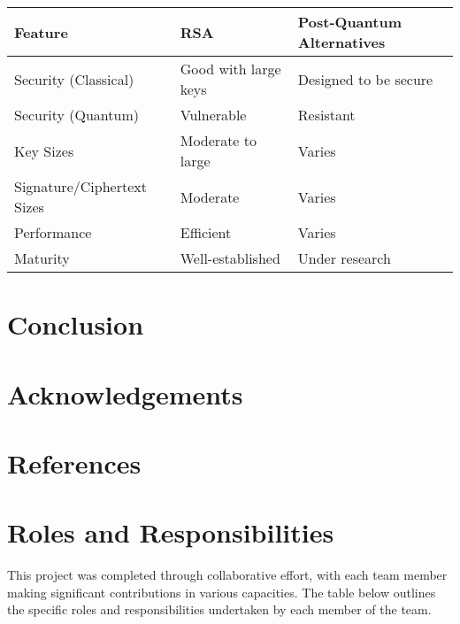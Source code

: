 \documentclass{article}
\begin{document}
\begin{center}
    \begin{tabular}{|l|l|l|}
        \hline
        \textbf{Feature}           & \textbf{RSA}         & \textbf{Post-Quantum Alternatives} \\
        \hline
        Security (Classical)       & Good with large keys & Designed to be secure              \\
        Security (Quantum)         & Vulnerable           & Resistant                          \\
        Key Sizes                  & Moderate to large    & Varies                             \\
        Signature/Ciphertext Sizes & Moderate             & Varies                             \\
        Performance                & Efficient            & Varies                             \\
        Maturity                   & Well-established     & Under research                     \\
        \hline
    \end{tabular}
\end{center}

\section{Conclusion}
\section{Acknowledgements}
\section{References}

\newpage
\section{Roles and Responsibilities}
This project was completed through collaborative effort, with each team member making significant contributions in various capacities. The table below outlines the specific roles and responsibilities undertaken by each member of the team.
\end{document}
